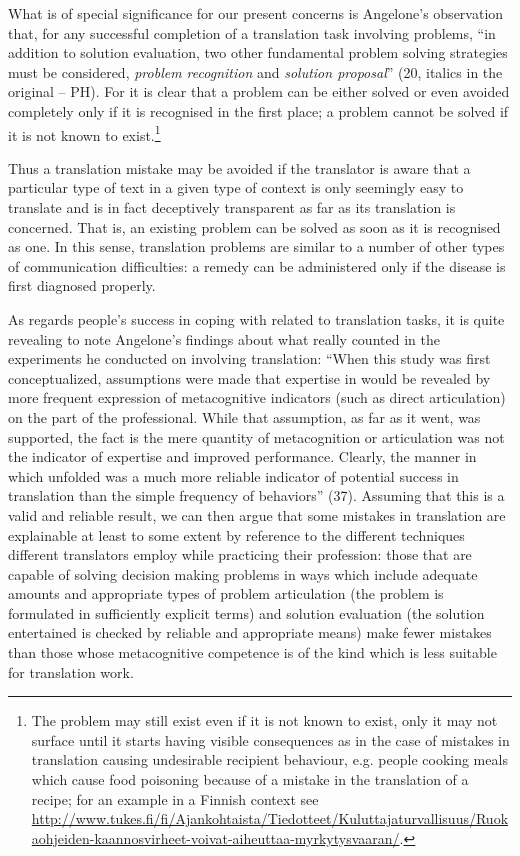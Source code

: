 \documentclass[output=paper]{LSP/langsci}
\begin{document}
  
  What is of special significance for our present concerns is Angelone's observation that, for any successful completion of a translation task involving problems, ``in addition to solution evaluation, two other fundamental  problem solving strategies must be considered, \textit{problem recognition} and \textit{solution proposal}'' (20, italics in the original -- PH). For it is clear that a problem can be either solved or even avoided completely only if it is recognised in the first place; a problem cannot be solved if it is not known to exist.\footnote{The problem may still exist even if it is not known to exist, only it may not surface until it starts having visible consequences as in the case of mistakes in translation causing undesirable recipient behaviour, e.g. people cooking meals which cause food poisoning because of a mistake in the translation of a recipe; for an example in a Finnish context see \url{http://www.tukes.fi/fi/Ajankohtaista/Tiedotteet/Kuluttajaturvallisuus/Ruokaohjeiden-kaannosvirheet-voivat-aiheuttaa-myrkytysvaaran/}.}

  
Thus a translation mistake may be avoided if the translator is aware that a particular type of text in a given type of context is only seemingly easy to translate and is in fact deceptively transparent as far as its translation is concerned. That is, an existing problem can be solved as soon as it is recognised as one. In this sense, translation problems are similar to a number of other types of communication difficulties: a remedy can be administered only if the disease is first diagnosed properly.


  As regards people's success in coping with  related to translation tasks, it is quite revealing to note Angelone's findings about what really counted in the experiments he conducted on  involving translation: ``When this study was first conceptualized, assumptions were made that expertise in  would be revealed by more frequent expression of metacognitive indicators (such as direct articulation) on the part of the professional. While that assumption, as far as it went, was supported, the fact is the mere quantity of metacognition or articulation was not the indicator of expertise and improved performance. Clearly, the manner in which  unfolded was a much more reliable indicator of potential success in translation than the simple frequency of  behaviors'' (37). Assuming that this is a valid and reliable result, we can then argue that some mistakes in translation are explainable at least to some extent by reference to the different techniques different translators employ while practicing their profession: those that are capable of solving decision making problems in ways which include adequate amounts and appropriate types of problem articulation (the problem is formulated in sufficiently explicit terms) and solution evaluation (the solution entertained is checked by reliable and appropriate means) make fewer mistakes than those whose metacognitive competence is of the kind which is less suitable for translation work.
\end{document}
